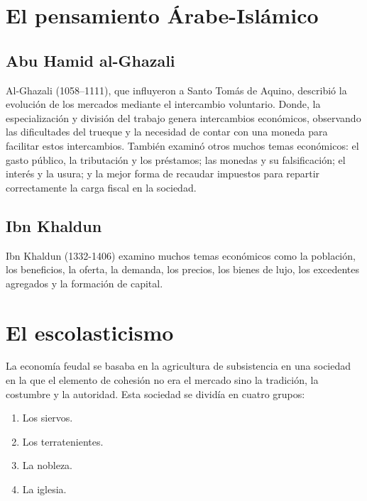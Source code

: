 \documentclass[10pt]{book}
\begin{document}
\section{El pensamiento Árabe-Islámico}
\subsection{Abu Hamid al-Ghazali}
Al-Ghazali (1058–1111), que influyeron a Santo Tomás de Aquino, describió la evolución de los mercados mediante el intercambio voluntario. Donde, la especialización y división del trabajo genera intercambios económicos, observando las dificultades del trueque y la necesidad de contar con una moneda para facilitar estos intercambios. También examinó otros muchos temas económicos: el gasto público, la tributación y los préstamos; las monedas y su falsificación; el interés y la usura; y la mejor forma de recaudar impuestos para repartir correctamente la carga fiscal en la sociedad.

\subsection{Ibn Khaldun}
Ibn Khaldun (1332-1406) examino muchos temas económicos como la población, los beneficios, la oferta, la demanda, los precios, los bienes de lujo, los excedentes agregados y la formación de capital.


\section{El escolasticismo}
La economía feudal se basaba en la agricultura de subsistencia en una sociedad en la que el elemento de cohesión no era el mercado sino la tradición, la costumbre y la autoridad. Esta sociedad se dividía en cuatro grupos:

\begin{enumerate}[1.]
    \item Los siervos.
    \item Los terratenientes.
    \item La nobleza.
    \item La iglesia.
\end{enumerate}
\end{document}
